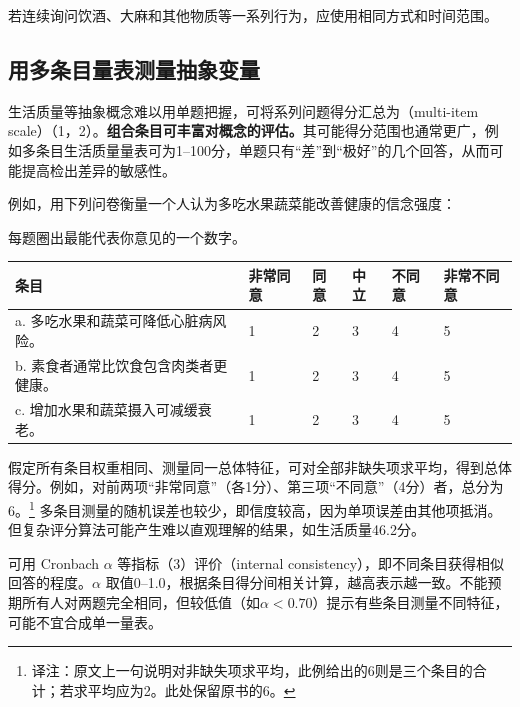若连续询问饮酒、大麻和其他物质等一系列行为，应使用相同方式和时间范围。

\subsection{用多条目量表测量抽象变量}
生活质量等抽象概念难以用单题把握，可将系列问题得分汇总为（multi-item scale）（1，2）。\textbf{组合条目可丰富对概念的评估。}其可能得分范围也通常更广，例如多条目生活质量量表可为1--100分，单题只有“差”到“极好”的几个回答，从而可能提高检出差异的敏感性。

例如，用下列问卷衡量一个人认为多吃水果蔬菜能改善健康的信念强度：
\begin{bookbox}{每题圈出最能代表你意见的一个数字。}
\small
\begin{tabularx}{\linewidth}{YL{.07\linewidth}L{.07\linewidth}L{.07\linewidth}L{.07\linewidth}L{.07\linewidth}}\toprule
条目 & 非常同意 & 同意 & 中立 & 不同意 & 非常不同意\\\midrule
a. 多吃水果和蔬菜可降低心脏病风险。 & 1&2&3&4&5\\
b. 素食者通常比饮食包含肉类者更健康。 &1&2&3&4&5\\
c. 增加水果和蔬菜摄入可减缓衰老。 &1&2&3&4&5\\\bottomrule
\end{tabularx}
\end{bookbox}
假定所有条目权重相同、测量同一总体特征，可对全部非缺失项求平均，得到总体得分。例如，对前两项“非常同意”（各1分）、第三项“不同意”（4分）者，总分为6。\footnote{译注：原文上一句说明对非缺失项求平均，此例给出的6则是三个条目的合计；若求平均应为2。此处保留原书的6。}
多条目测量的随机误差也较少，即信度较高，因为单项误差由其他项抵消。但复杂评分算法可能产生难以直观理解的结果，如生活质量46.2分。

可用 Cronbach $\alpha$ 等指标（3）评价（internal consistency），即不同条目获得相似回答的程度。$\alpha$ 取值0--1.0，根据条目得分间相关计算，越高表示越一致。不能预期所有人对两题完全相同，但较低值（如$\alpha<0.70$）提示有些条目测量不同特征，可能不宜合成单一量表。

